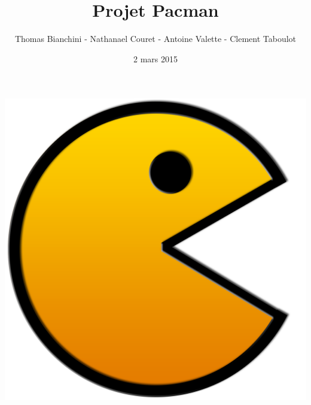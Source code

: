 \documentclass{article}
\author{Thomas Bianchini - Nathanael Couret - Antoine Valette - Clement Taboulot}
\title{Projet Pacman}
\date{2 mars 2015}
\begin{document}
\maketitle

\centerline{\includegraphics[scale=0.3]{pics/Pacman_HD}}

\pagebreak

\tableofcontents

\pagebreak








\end{document}
